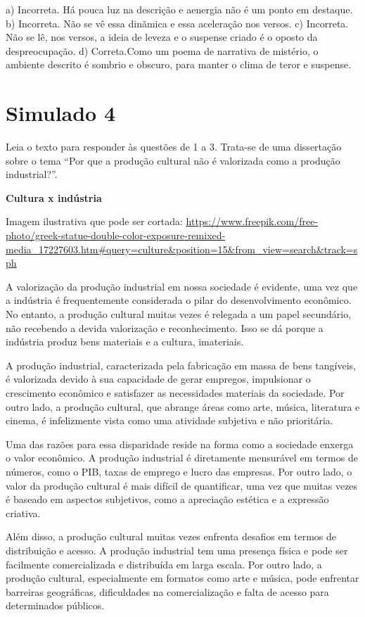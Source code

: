 \begin{escolha}
\begin{escolha}
\begin{escolha}
a) Incorreta. Há pouca luz na descrição e aenergia não é um ponto em
destaque. b) Incorreta. Não se vê essa dinãmica e essa aceleração nos
versos. c) Incorreta. Não se lê, nos versos, a ideia de leveza e o
suspense criado é o oposto da despreocupação. d) Correta.Como um poema
de narrativa de mistério, o ambiente descrito é sombrio e obscuro, para
manter o clima de teror e suspense.

\chapter{Simulado 4}

Leia o texto para responder às questões de 1 a 3. Trata-se de uma
dissertação sobre o tema ``Por que a produção cultural não é valorizada
como a produção industrial?''.

\textbf{Cultura x indústria}

Imagem ilustrativa que pode ser cortada:
\url{https://www.freepik.com/free-photo/greek-statue-double-color-exposure-remixed-media_17227603.htm\#query=culture\&position=15\&from_view=search\&track=sph}

A valorização da produção industrial em nossa sociedade é evidente, uma
vez que a indústria é frequentemente considerada o pilar do
desenvolvimento econômico. No entanto, a produção cultural muitas vezes
é relegada a um papel secundário, não recebendo a devida valorização e
reconhecimento. Isso se dá porque a indústria produz bens materiais e a
cultura, imateriais.

A produção industrial, caracterizada pela fabricação em massa de bens
tangíveis, é valorizada devido à sua capacidade de gerar empregos,
impulsionar o crescimento econômico e satisfazer as necessidades
materiais da sociedade. Por outro lado, a produção cultural, que abrange
áreas como arte, música, literatura e cinema, é infelizmente vista como
uma atividade subjetiva e não prioritária.

Uma das razões para essa disparidade reside na forma como a sociedade
enxerga o valor econômico. A produção industrial é diretamente
mensurável em termos de números, como o PIB, taxas de emprego e lucro
das empresas. Por outro lado, o valor da produção cultural é mais
difícil de quantificar, uma vez que muitas vezes é baseado em aspectos
subjetivos, como a apreciação estética e a expressão criativa.

Além disso, a produção cultural muitas vezes enfrenta desafios em termos
de distribuição e acesso. A produção industrial tem uma presença física
e pode ser facilmente comercializada e distribuída em larga escala. Por
outro lado, a produção cultural, especialmente em formatos como arte e
música, pode enfrentar barreiras geográficas, dificuldades na
comercialização e falta de acesso para determinados públicos.


\end{escolha}
\end{escolha}
\end{escolha}
